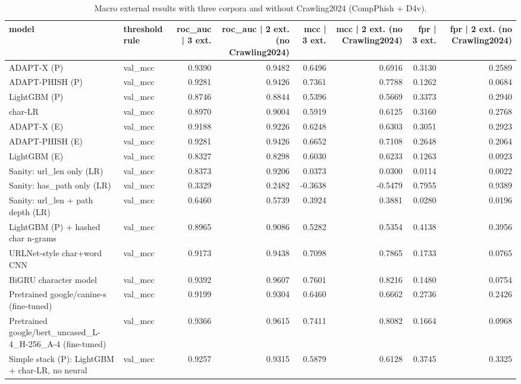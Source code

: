 \begin{table}[t]
\centering
\scriptsize
\caption{Macro external results with three corpora and without Crawling2024 (CompPhish + D4v).}
\label{tab:rev_R3_external_macro_with_without_crawling2024}
\begin{tabular}{llrrrrrr}
\toprule
model & threshold rule & roc\_auc | 3 ext. & roc\_auc | 2 ext. (no Crawling2024) & mcc | 3 ext. & mcc | 2 ext. (no Crawling2024) & fpr | 3 ext. & fpr | 2 ext. (no Crawling2024) \\
\midrule
ADAPT-X (P) & val\_mcc & 0.9390 & 0.9482 & 0.6496 & 0.6916 & 0.3130 & 0.2589 \\
ADAPT-PHISH (P) & val\_mcc & 0.9281 & 0.9426 & 0.7361 & 0.7788 & 0.1262 & 0.0684 \\
LightGBM (P) & val\_mcc & 0.8746 & 0.8844 & 0.5396 & 0.5669 & 0.3373 & 0.2940 \\
char-LR & val\_mcc & 0.8970 & 0.9004 & 0.5919 & 0.6125 & 0.3160 & 0.2768 \\
ADAPT-X (E) & val\_mcc & 0.9188 & 0.9226 & 0.6248 & 0.6303 & 0.3051 & 0.2923 \\
ADAPT-PHISH (E) & val\_mcc & 0.9281 & 0.9426 & 0.6652 & 0.7108 & 0.2648 & 0.2064 \\
LightGBM (E) & val\_mcc & 0.8327 & 0.8298 & 0.6030 & 0.6233 & 0.1263 & 0.0923 \\
Sanity: url\_len only (LR) & val\_mcc & 0.8373 & 0.9206 & 0.0373 & 0.0300 & 0.0114 & 0.0022 \\
Sanity: has\_path only (LR) & val\_mcc & 0.3329 & 0.2482 & -0.3638 & -0.5479 & 0.7955 & 0.9389 \\
Sanity: url\_len + path depth (LR) & val\_mcc & 0.6460 & 0.5739 & 0.3924 & 0.3881 & 0.0280 & 0.0196 \\
LightGBM (P) + hashed char n-grams & val\_mcc & 0.8965 & 0.9086 & 0.5282 & 0.5354 & 0.4138 & 0.3956 \\
URLNet-style char+word CNN & val\_mcc & 0.9173 & 0.9438 & 0.7098 & 0.7865 & 0.1733 & 0.0765 \\
BiGRU character model & val\_mcc & 0.9392 & 0.9607 & 0.7601 & 0.8216 & 0.1480 & 0.0754 \\
Pretrained google/canine-s (fine-tuned) & val\_mcc & 0.9199 & 0.9304 & 0.6460 & 0.6662 & 0.2736 & 0.2426 \\
Pretrained google/bert\_uncased\_L-4\_H-256\_A-4 (fine-tuned) & val\_mcc & 0.9366 & 0.9615 & 0.7411 & 0.8082 & 0.1664 & 0.0968 \\
Simple stack (P): LightGBM + char-LR, no neural & val\_mcc & 0.9257 & 0.9315 & 0.5879 & 0.6128 & 0.3745 & 0.3325 \\

\end{tabular}
\end{table}
